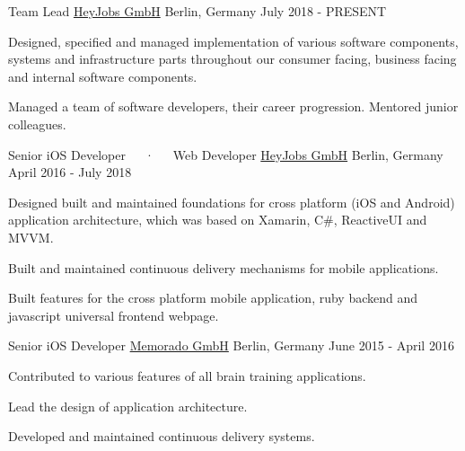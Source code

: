 

\begin{cventries}

  \cventry
    {Team Lead} %
    {\href{https://heyjobs.co}{HeyJobs GmbH}} %
    {Berlin, Germany} %
    {July 2018 - PRESENT} %
    {
      \begin{cvitems} %
        \item {Designed, specified and managed implementation of various software components, systems and infrastructure parts throughout our consumer facing, business facing and internal software components.}
        \item {Managed a team of software developers, their career progression. Mentored junior colleagues.}
      \end{cvitems}
    }

  \cventry
    {Senior iOS Developer~~~·~~~Web Developer} %
    {\href{https://heyjobs.co}{HeyJobs GmbH}} %
    {Berlin, Germany} %
    {April 2016 - July 2018} %
    {
      \begin{cvitems} %
        \item {Designed built and maintained foundations for cross platform (iOS and Android) application architecture, which was based on Xamarin, C\#, ReactiveUI and MVVM.}
        \item {Built and maintained continuous delivery mechanisms for mobile applications.}
        \item {Built features for the cross platform mobile application, ruby backend and javascript universal frontend webpage.}
      \end{cvitems}
    }

  \cventry
    {Senior iOS Developer} %
    {\href{https://memorado.com}{Memorado GmbH}} %
    {Berlin, Germany} %
    {June 2015 - April 2016} %
    {
      \begin{cvitems} %
        \item {Contributed to various features of all brain training applications.}
        \item {Lead the design of application architecture.}
        \item {Developed and maintained continuous delivery systems.}
      \end{cvitems}
    }


\end{cventries}

